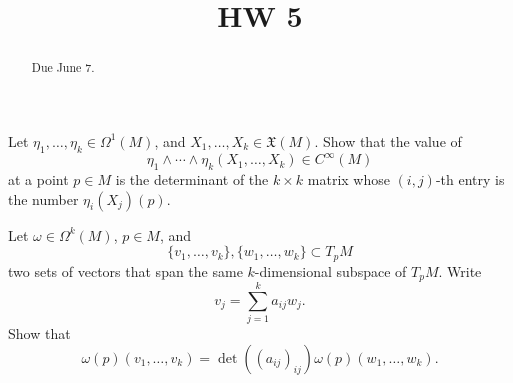 \documentclass{ximera}
\title{HW 5}
\begin{document}
    \begin{abstract}  Due June 7.  \end{abstract}
    \maketitle


\begin{exercise}
  Let $\eta_1, \ldots , \eta_k \in \Omega ^1 (M)$, and $X_1, \ldots , X_k \in \mathfrak{X}(M)$. Show that the value  of  
    \[     \eta _1 \wedge \cdots \wedge  \eta _k  ( X_1, \ldots , X_k)  \in C^{\infty}(M)         \]
    at a point $p \in M$ is the determinant of the $k \times k$ matrix whose $(i,j)$-th entry is the number $\eta _i (X_j) (p)$.     
\end{exercise}


\begin{exercise}
 Let $\omega \in \Omega ^k (M) $, $p \in M$, and 
    \[   \{ v_1, \ldots , v_k \} , \{ w_1, \ldots , w_k \}   \subset T_pM          \]
    two sets of vectors that span the same $k$-dimensional subspace of $T_pM$. Write
    \[         v_j = \sum _{j = 1}^k a_{ij} w_j   .      \]
    Show that 
    \[       \omega (p) (v_1, \ldots, v_k ) = \det ( (a_{ij})_{ij}) \omega (p) (w_1, \ldots , w_k).                            \]
    
\end{exercise}
\end{document}
